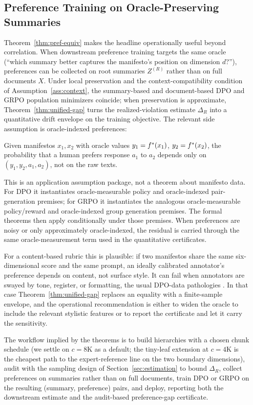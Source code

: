\subsection{Preference Training on Oracle-Preserving Summaries}\label{sec:benoit-preference}

Theorem~\ref{thm:pref-equiv} makes the headline operationally useful
beyond correlation. When downstream preference training targets the
same oracle (``which summary better captures the manifesto's
position on dimension $d$?''), preferences can be collected on root
summaries $Z^{(R)}$ rather than on full documents $X$. Under local
preservation and the context-compatibility condition of
Assumption~\ref{ass:context}, the summary-based and
document-based DPO and GRPO population minimizers coincide; when
preservation is approximate, Theorem~\ref{thm:unified-gap} turns the
realized-violation estimate $\Delta_R$ into a quantitative drift
envelope on the training objective. The relevant side assumption is
oracle-indexed preferences:

\begin{assumption}\label{ass:pref}
Given manifestos $x_1, x_2$ with oracle values
$y_1 = f^\ast(x_1)$, $y_2 = f^\ast(x_2)$, the probability that a human
prefers response $a_1$ to $a_2$ depends only on $(y_1, y_2, a_1, a_2)$,
not on the raw texts.
\end{assumption}

This is an application assumption package, not a theorem about manifesto
data. For DPO it instantiates oracle-measurable policy and
oracle-indexed pair-generation premises; for GRPO it instantiates the
analogous oracle-measurable policy/reward and oracle-indexed group
generation premises. The formal theorems then apply conditionally under
those premises. When preferences are noisy or only approximately
oracle-indexed, the residual is carried through the same
oracle-measurement term used in the quantitative certificates.

For a content-based rubric this is plausible: if two manifestos share
the same six-dimensional score and the same prompt, an ideally
calibrated annotator's preference depends on content, not surface
style. It can fail when annotators are swayed by tone, register, or
formatting, the usual DPO-data pathologies \citep{RafailovEtAl2023DPO}.
In that case Theorem~\ref{thm:unified-gap} replaces an equality with a
finite-sample envelope, and the operational recommendation is either
to widen the oracle to include the relevant stylistic features or to
report the certificate and let it carry the sensitivity.

The workflow implied by the theorems is to build hierarchies with a chosen chunk schedule (we settle on $c = 8\mathrm{K}$ as a default; the tiny-leaf extension at $c = 4\mathrm{K}$ is the cheapest path to the expert-reference line on the two boundary dimensions), audit with the sampling design of Section~\ref{sec:estimation} to bound $\Delta_R$, collect preferences on summaries rather than on full documents, train DPO or GRPO on the resulting (summary, preference) pairs, and deploy, reporting both the downstream estimate and the audit-based preference-gap certificate.
